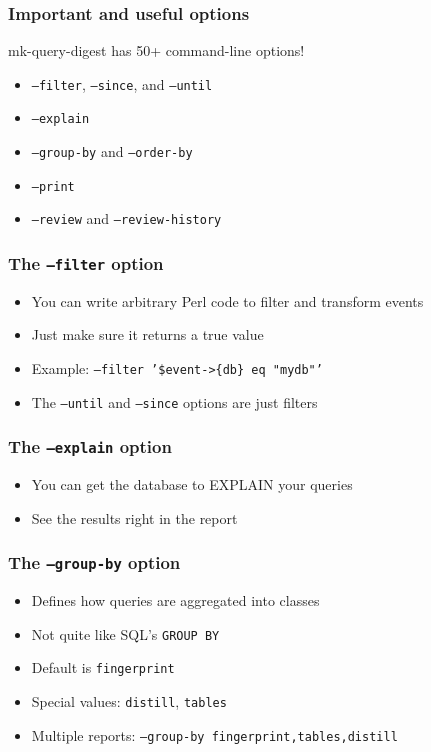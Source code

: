 \begin{frame}
   \frametitle{Important and useful options}
   \begin{block}{mk-query-digest has 50+ command-line options!}
   \begin{itemize}
      \item \texttt{--filter}, \texttt{--since}, and \texttt{--until}
      \item \texttt{--explain}
      \item \texttt{--group-by} and \texttt{--order-by}
      \item \texttt{--print}
      \item \texttt{--review} and \texttt{--review-history}
   \end{itemize}
   \end{block}
\end{frame}

\begin{frame}
   \frametitle{The \texttt{--filter} option}
   \begin{itemize}
      \item You can write arbitrary Perl code to filter and transform events
      \item Just make sure it returns a true value
      \item Example: \texttt{--filter '\$event->\{db\} eq "mydb"'}
      \item The \texttt{--until} and \texttt{--since} options are just filters
   \end{itemize}
\end{frame}

\begin{frame}
   \frametitle{The \texttt{--explain} option}
   \begin{itemize}
      \item You can get the database to EXPLAIN your queries
      \item See the results right in the report
   \end{itemize}
\end{frame}

\begin{frame}
   \frametitle{The \texttt{--group-by} option}
   \begin{itemize}
      \item Defines how queries are aggregated into classes
      \item Not quite like SQL's \texttt{GROUP BY}
      \item Default is \texttt{fingerprint}
      \item Special values: \texttt{distill}, \texttt{tables}
      \item Multiple reports: \texttt{--group-by fingerprint,tables,distill}
   \end{itemize}
\end{frame}

